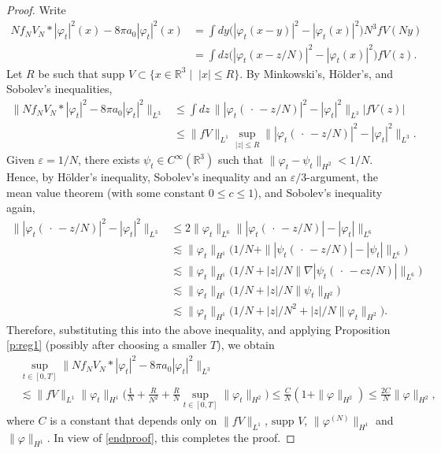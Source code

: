 \documentclass[11pt,a4paper]{scrartcl} %
\newcommand{\R}{\mathds{R}}
\begin{document}
\begin{proof}
  Write
  \begin{align*}
    N f_N V_N * |\varphi_t|^2(x) - 8 \pi a_0 |\varphi_t|^2(x) & = \int dy
    \big( |\varphi_t(x-y)|^2 - |\varphi_t(x)|^2 \big) N^3 fV(Ny) \\
    & = \int dz \big( |\varphi_t(x-z/N)|^2 - |\varphi_t(x)|^2 \big) fV(z).
  \end{align*}
  Let $R$ be such that $\text{supp }V \subset \{ x \in \R^3 \; | \;\; |x| \le
  R \}$. By Minkowski's, H\"older's, and Sobolev's inequalities,
  \begin{align*}
    \| N f_N V_N * |\varphi_t|^2 - 8 \pi a_0 |\varphi_t|^2 \|_{L^3} & \le \int
    dz \, \| |\varphi_t(\, \cdot \, -z/N)|^2 - |\varphi_t|^2 \|_{L^3} |fV(z)|
    \\
    & \le \| fV \|_{L^1} \sup_{|z| \le R} \| |\varphi_t(\, \cdot \, - z/N)|^2
    - |\varphi_t|^2 \|_{L^3}.
  \end{align*}
  Given $\varepsilon = 1/N$, there exists $\psi_t \in C^\infty(\R^3)$ such
  that $\| \varphi_t - \psi_t \|_{H^2} < 1/N$. Hence, by H\"older's
  inequality, Sobolev's inequality and an $\varepsilon/3$-argument, the mean
  value theorem (with some constant $0 \le c \le 1$), and Sobolev's inequality
  again,
  \begin{align*}
    \| |\varphi_t(\, \cdot \, - z/N)|^2 - |\varphi_t|^2 \|_{L^3} & \le 2 \|
    \varphi_t \|_{L^6} \| |\varphi_t(\, \cdot \, - z/N)| - |\varphi_t|
    \|_{L^6} \\
    & \apprle \| \varphi_t \|_{H^1} \big( 1/N + \| |\psi_t(\, \cdot \, - z/N)|
    - |\psi_t| \|_{L^6} \big) \\
    & \apprle \| \varphi_t \|_{H^1} \big( 1/N + |z|/N \| \nabla |\psi_t(\,
    \cdot \, - c z/N)| \|_{L^6} \big) \\
    & \apprle \| \varphi_t \|_{H^1} \big( 1/N + |z|/N \| \psi_t \|_{H^2} \big)
    \\
    & \apprle \| \varphi_t \|_{H^1} \big( 1/N + |z|/N^2 + |z|/N \| \varphi_t
    \|_{H^2} \big).
  \end{align*}
  Therefore, substituting this into the above inequality, and applying
  Proposition \ref{p:reg1} (possibly after choosing a smaller $T$), we obtain
  \begin{align*}
    & \sup_{t \in [0,T]} \| N f_N V_N * |\varphi_t|^2 - 8 \pi a_0
    |\varphi_t|^2 \|_{L^3} \\
    & \apprle \| fV \|_{L^1} \| \varphi_t \|_{H^1} \Big( \frac{1}{N} +
    \frac{R}{N^2} + \frac{R}{N} \sup_{t \in [0,T]} \| \varphi_t \|_{H^2} \Big)
    \le \frac{C}{N}(1 + \| \varphi \|_{H^2}) \le \frac{2C}{N}\| \varphi
    \|_{H^2},
  \end{align*}
  where $C$ is a constant that depends only on $\| fV \|_{L^1}$, $\text{supp
  }V$, $\| \varphi^{(N)} \|_{H^1}$ and $\| \varphi \|_{H^1}$. In view of
  \eqref{endproof}, this completes the proof.
\end{proof}
\end{document}
